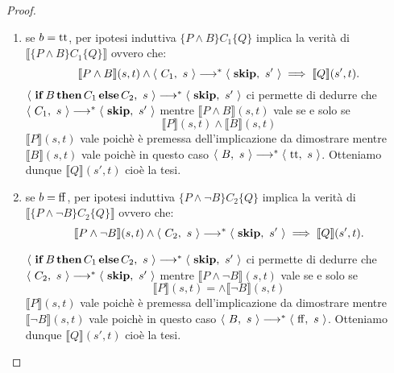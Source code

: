 \begin{teorema}
\begin{proof}
\begin{enumerate}
\item se $b = \mathrm{tt}$, per ipotesi induttiva 
$\{P \land B\} C_1\{Q\}$ implica la verità di 
$\bigl \llbracket \{P \land B\} C_1 \{Q\} \bigr \rrbracket$ ovvero che:
\[
  \llbracket P \land B \rrbracket(s, t) \land 
    \langle\ C_1,\ s\ \rangle \longrightarrow^* \langle\ \mathop{\textup{\textbf{skip}}},\ s'\ \rangle
      \implies \llbracket Q \rrbracket(s', t).
\]
$\langle\ \mathop{\textup{\textbf{if}}} B \mathop{\textup{\textbf{then}}} C_1 \mathop{\textup{\textbf{else}}}
C_2,\ s\ \rangle \longrightarrow^* \langle\ \mathop{\textup{\textbf{skip}}},\ s'\ \rangle$ ci permette di dedurre che
$\langle\ C_1,\ s\ \rangle \longrightarrow^* \langle\ \mathop{\textup{\textbf{skip}}},\ s'\ \rangle$
mentre $\llbracket P \land B \rrbracket(s, t)$ vale se e solo se
\[
  \llbracket P \rrbracket(s, t)
    \land \llbracket B \rrbracket(s, t)
\]
$\llbracket P \rrbracket(s, t)$ vale poichè è premessa
dell'implicazione da dimostrare mentre $\llbracket B \rrbracket(s, t)$ 
vale poichè in questo caso $\langle\ B,\ s\ \rangle \longrightarrow^* \langle\ \mathrm{tt},\ s\ \rangle$.
Otteniamo dunque $\llbracket Q \rrbracket(s', t)$
cioè la tesi.

\item se $b = \mathrm{ff}$, per ipotesi induttiva 
$\{P \land \neg B\} C_2\{Q\}$ implica la verità di 
$\bigl \llbracket \{P \land \neg B\} C_2 \{Q\} \bigr \rrbracket$ ovvero che:
\[
  \llbracket P \land \neg B \rrbracket(s, t) \land 
    \langle\ C_2,\ s\ \rangle \longrightarrow^* \langle\ \mathop{\textup{\textbf{skip}}},\ s'\ \rangle
      \implies \llbracket Q \rrbracket(s', t).
\]

$\langle\ \mathop{\textup{\textbf{if}}} B \mathop{\textup{\textbf{then}}} C_1 \mathop{\textup{\textbf{else}}}
C_2,\ s\ \rangle \longrightarrow^* \langle\ \mathop{\textup{\textbf{skip}}},\ s'\ \rangle$ ci permette di dedurre che
$\langle\ C_2,\ s\ \rangle \longrightarrow^* \langle\ \mathop{\textup{\textbf{skip}}},\ s'\ \rangle$
mentre $\llbracket P \land \neg B \rrbracket(s, t)$ vale se e solo se
\[
  \llbracket P \rrbracket(s, t) = 
    \land \llbracket \neg B \rrbracket(s, t)
\]
$\llbracket P \rrbracket(s, t)$ vale poichè è premessa
dell'implicazione da dimostrare mentre $\llbracket \neg B \rrbracket(s, t)$ 
vale poichè in questo caso $\langle\ B,\ s\ \rangle \longrightarrow^* \langle\ \mathrm{ff},\ s\ \rangle$.
Otteniamo dunque $\llbracket Q \rrbracket(s', t)$
cioè la tesi.
\end{enumerate}

\end{proof}
\end{teorema}

